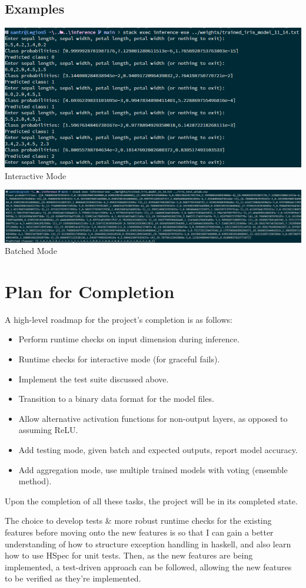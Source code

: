 \documentclass[12pt]{article}
\begin{document}
\subsection{Examples}
{
	\centering
	\includegraphics[width=\textwidth]{../images/examples.png}
	Interactive Mode

	\vspace{1cm}
	\includegraphics[width=\textwidth]{../images/examplebatch.png}
	Batched Mode

}

\section{Plan for Completion}
A high-level roadmap for the project's completion is as follows:
\begin{itemize}
	\item Perform runtime checks on input dimension during inference.
	\item Runtime checks for interactive mode (for graceful fails).
	\item Implement the test suite discussed above.
	\item Transition to a binary data format for the model files.
	\item Allow alternative activation functions for non-output layers, as opposed to assuming ReLU.
	\item Add testing mode, given batch and expected outputs, report model accuracy.
	\item Add aggregation mode, use multiple trained models with voting (ensemble method).
\end{itemize}
Upon the completion of all these tasks, the project will be in its completed state.\bigskip

The choice to develop tests \& more robust runtime checks for the existing features before moving onto the new features is so that I can gain a better understanding of how to structure exception handling in haskell, and also learn how to use HSpec for unit tests. Then, as the new features are being implemented, a test-driven approach can be followed, allowing the new features to be verified as they're implemented.
\end{document}
